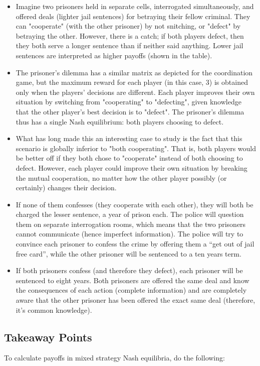 \documentclass[]{report}
\begin{document}
\begin{itemize}
\item Imagine two prisoners held in separate cells, interrogated simultaneously, and offered deals (lighter jail sentences) for betraying their fellow criminal. They can "cooperate" (with the other prisoner) by not snitching, or "defect" by betraying the other. However, there is a catch; if both players defect, then they both serve a longer sentence than if neither said anything. Lower jail sentences are interpreted as higher payoffs (shown in the table).
\item 
The prisoner's dilemma has a similar matrix as depicted for the coordination game, but the maximum reward for each player (in this case, 3) is obtained only when the players' decisions are different. Each player improves their own situation by switching from "cooperating" to "defecting", given knowledge that the other player's best decision is to "defect". The prisoner's dilemma thus has a single Nash equilibrium: both players choosing to defect.
\item 
What has long made this an interesting case to study is the fact that this scenario is globally inferior to "both cooperating". That is, both players would be better off if they both chose to "cooperate" instead of both choosing to defect. However, each player could improve their own situation by breaking the mutual cooperation, no matter how the other player possibly (or certainly) changes their decision.

\item If none of them confesses (they cooperate with each other), they will both be charged the lesser sentence, a year of prison each. The police will question them on separate interrogation rooms, which means that the two prisoners cannot communicate (hence imperfect information). The police will try to convince each prisoner to confess the crime by offering them a “get out of jail free card”, while the other prisoner will be sentenced to a ten years term. 
\item If both prisoners confess (and therefore they defect), each prisoner will be sentenced to eight years. Both prisoners are offered the same deal and know the consequences of each action (complete information) and are completely aware that the other prisoner has been offered the exact same deal (therefore, it’s common knowledge).
\end{itemize}
\subsection{Takeaway Points}
To calculate payoffs in mixed strategy Nash equilibria, do the following:
\end{document}
